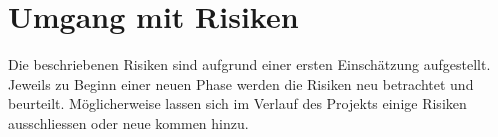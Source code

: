 \section{Umgang mit Risiken}
Die beschriebenen Risiken sind aufgrund einer ersten Einschätzung aufgestellt.
Jeweils zu Beginn einer neuen Phase werden die Risiken neu betrachtet und beurteilt. Möglicherweise lassen sich im Verlauf des Projekts einige Risiken ausschliessen oder neue kommen hinzu.
